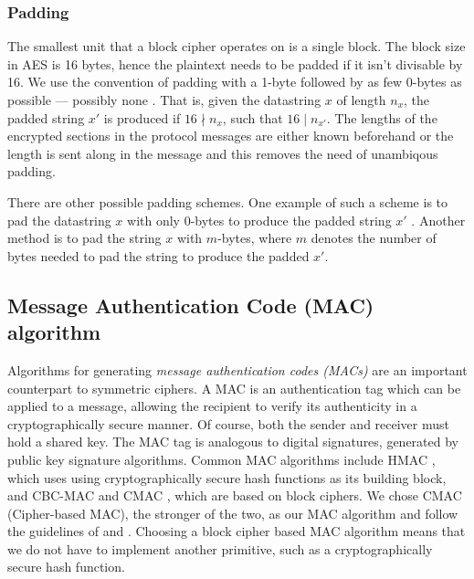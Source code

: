 
\subsubsection{Padding}

The smallest unit that a block cipher operates on is a single
block. The block size in AES is 16 bytes, hence the plaintext needs to
be padded if it isn't divisable by 16. We use the convention of
padding with a 1-byte followed by as few 0-bytes as possible ---
possibly none \cite[Appendex A]{dworkin2001}. That is, given the
datastring $x$ of length $n_x$, the padded string $x'$ is produced if
$16 \nmid n_x$, such that $16 \mid n_{x'}$. The lengths of the
encrypted sections in the protocol messages are either known
beforehand or the length is sent along in the message and this removes
the need of unambiqous padding.

There are other possible padding schemes. One example of such a scheme
is to pad the datastring $x$ with only 0-bytes to produce the padded
string $x'$ \cite[pp. 343]{menzes1996}. Another method is to pad the
string $x$ with $m$-bytes, where $m$ denotes the number of bytes needed to
pad the string to produce the padded $x'$. \cite{RFC-2315-kaliski-1998}


\subsection{Message Authentication Code (MAC) algorithm}

Algorithms for generating \textit{message authentication codes (MACs)} are an important counterpart to symmetric ciphers. A MAC is an authentication tag which can be applied to a message, allowing the recipient to verify its authenticity in a cryptographically secure manner. Of course, both the sender and receiver must hold a shared key. The MAC tag is analogous to digital signatures, generated by public key signature algorithms. Common MAC algorithms include HMAC , which uses using cryptographically secure hash functions as its building block, and CBC-MAC  and CMAC , which are based on block ciphers. We chose CMAC (Cipher-based MAC), the stronger of the two, as our MAC algorithm and follow the guidelines of  and . Choosing a block cipher based MAC algorithm means that we do not have to implement another primitive, such as a cryptographically secure hash function.

